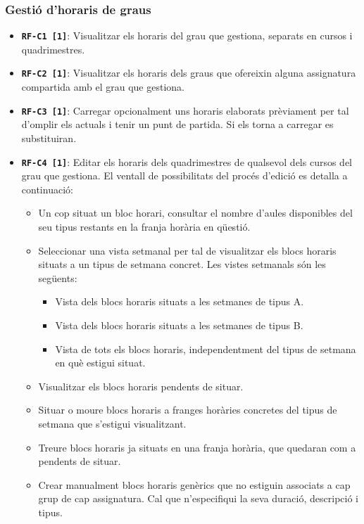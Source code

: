 \documentclass[a4paper,12pt]{ThesisStyle}
\begin{document}
\subsubsection{Gestió d'horaris de graus}
\begin{itemize}
  \item \texttt{\textbf{RF-C1 [1]}}: Visualitzar els horaris del grau que gestiona, separats en cursos i quadrimestres.
  \item \texttt{\textbf{RF-C2 [1]}}: Visualitzar els horaris dels graus que ofereixin alguna assignatura compartida amb el grau que gestiona.
  \item \texttt{\textbf{RF-C3 [1]}}: Carregar opcionalment uns horaris elaborats prèviament per tal d'omplir els actuals i tenir un punt de partida. Si els torna a carregar es substituiran.
  \item \texttt{\textbf{RF-C4 [1]}}: Editar els horaris dels quadrimestres de qualsevol dels cursos del grau que gestiona. El ventall de possibilitats del procés d'edició es detalla a continuació:
        \begin{itemize}
          \item Un cop situat un bloc horari, consultar el nombre d'aules disponibles del seu tipus restants en la franja horària en qüestió.
          \item Seleccionar una vista setmanal per tal de visualitzar els blocs horaris situats a un tipus de setmana concret. Les vistes setmanals són les següents:
                \begin{itemize}
                  \item Vista dels blocs horaris situats a les setmanes de tipus A.
                  \item Vista dels blocs horaris situats a les setmanes de tipus B.
                  \item Vista de tots els blocs horaris, independentment del tipus de setmana en què estigui situat.
                \end{itemize}
          \item Visualitzar els blocs horaris pendents de situar.
          \item Situar o moure blocs horaris a franges horàries concretes del tipus de setmana que s'estigui visualitzant.
          \item Treure blocs horaris ja situats en una franja horària, que quedaran com a pendents de situar.
          \item Crear manualment blocs horaris genèrics que no estiguin associats a cap grup de cap assignatura. Cal que n'especifiqui la seva duració, descripció i tipus.

\end{itemize}
\end{itemize}
\end{document}
